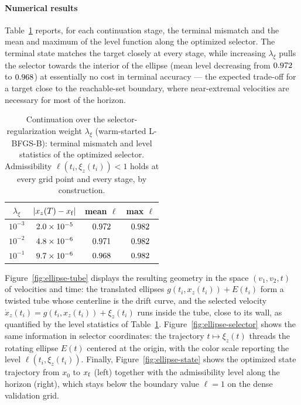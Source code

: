 \documentclass[11pt]{elsarticle}
\theoremstyle{definition}
\theoremstyle{remark}
\numberwithin{equation}{section}
\begin{document}
\paragraph{Numerical results}
Table~\ref{tab:ellipse-continuation} reports, for each continuation
stage, the terminal mismatch and the mean and maximum of the level
function along the optimized selector. The terminal state matches the
target closely at every stage, while increasing
$\lambda_{\xi}$ pulls the selector towards the interior of
the ellipse (mean level decreasing from $0.972$ to $0.968$) at
essentially no cost in terminal accuracy --- the expected trade-off for
a target close to the reachable-set boundary, where near-extremal
velocities are necessary for most of the horizon.

\begin{table}[htbp]
	\centering
	\begin{tabular}{cccc}
		\toprule
		$\lambda_{\xi}$ & $|x_z(T)-x_{\rm f}|$ & mean $\ell$ & max $\ell$ \\
		\midrule
		$10^{-3}$ & $2.0\times10^{-5}$ & $0.972$ & $0.982$ \\
		$10^{-2}$ & $4.8\times10^{-6}$ & $0.971$ & $0.982$ \\
		$10^{-1}$ & $9.7\times10^{-6}$ & $0.968$ & $0.982$ \\
		\bottomrule
	\end{tabular}
	\caption{Continuation over the selector-regularization weight
		$\lambda_{\xi}$ (warm-started L-BFGS-B): terminal mismatch and level
		statistics of the optimized selector. Admissibility
		$\ell(t_i,\xi_z(t_i))<1$ holds at every grid point and every stage, by
		construction.}
	\label{tab:ellipse-continuation}
\end{table}

Figure~\ref{fig:ellipse-tube} displays the resulting geometry in the
space $(v_1,v_2,t)$ of velocities and time: the translated ellipses
$g(t_i,x_z(t_i))+E(t_i)$ form a twisted tube whose centerline is the
drift curve, and the selected velocity
$\dot{x}_z(t_i)=g(t_i,x_z(t_i))+\xi_z(t_i)$ runs inside the tube, close
to its wall, as quantified by the level statistics of
Table~\ref{tab:ellipse-continuation}. Figure~\ref{fig:ellipse-selector}
shows the same information in selector coordinates: the trajectory
$t\mapsto\xi_z(t)$ threads the rotating ellipse $E(t)$ centered at the
origin, with the color scale reporting the level
$\ell(t_i,\xi_z(t_i))$. Finally, Figure~\ref{fig:ellipse-state} shows
the optimized state trajectory from $x_0$ to $x_{\rm f}$ (left) together
with the admissibility level along the horizon (right), which stays
below the boundary value $\ell=1$ on the dense validation grid.
\end{document}
